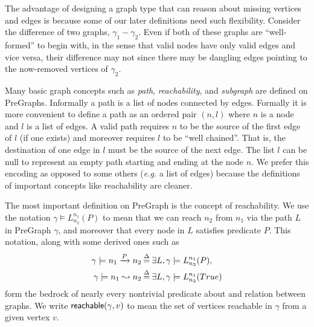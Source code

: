The advantage of designing a graph type that can reason about missing vertices and edges is because some of our later definitions need such flexibility.  Consider the difference of two graphs, $\gamma_1 - \gamma_2$.  Even if both of these graphs are ``well-formed'' to begin with, in the sense that valid nodes have only valid edges and vice versa, their difference may not since there may be dangling edges pointing to the now-removed vertices of $\gamma_2$.

Many basic graph concepts such as \emph{path}, \emph{reachability}, and \emph{subgraph} are defined on PreGraphs.
Informally a path is a list of nodes connected by edges.  Formally it is more convenient to
define a path as an ordered pair $(n,l)$ where $n$ is a node and $l$ is a list of edges.
A valid path requires $n$ to be the source of the first edge of $l$ (if one exists) and moreover
requires $l$ to be ``well chained''.  That is, the destination of one edge in $l$ must be the 
source of the next edge.  The list $l$ can be null to represent an empty path starting and ending
at the node $n$.  We prefer this encoding as opposed to some others (\emph{e.g.} a list of edges)
because the definitions of important concepts like reachability are cleaner.

The most important definition on PreGraph is the concept of reachability.
We use the notation $\gamma \models L_{n_2}^{n_1}(P)$ to mean that we can reach $n_2$ from $n_1$ via the path $L$ in PreGraph $\gamma$, and moreover that every node in $L$ satisfies predicate $P$.  This notation, along
with some derived ones such as
\begin{equation*}
\begin{split}
\gamma\models n_1 \xrightarrow{P} n_2 &\mathbin{\stackrel{\Delta}{=}} \exists L, \gamma \models L_{n_2}^{n_1}(P),\\
\gamma\models n_1 \leadsto n_2 &\mathbin{\stackrel{\Delta}{=}} \exists L, \gamma \models L_{n_2}^{n_1}(True)
\end{split}
\end{equation*}
form the bedrock of nearly every nontrivial predicate about and relation between
graphs.
We write $\mathsf{reachable}(\gamma,v)$ to mean the set of vertices reachable in $\gamma$ from a given vertex $v$.

